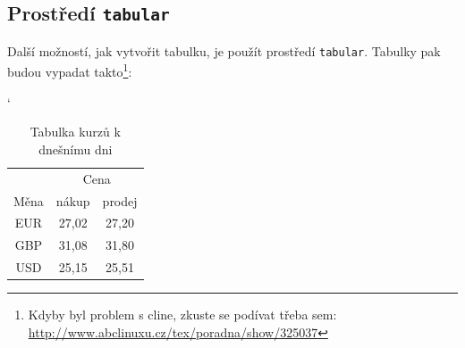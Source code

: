 \documentclass[11pt, a4paper]{article}
\begin{document}
\subsection{Prostředí \texttt{tabular}}
Další možností, jak vytvořit tabulku, je použít prostředí \verb|tabular|. Tabulky pak budou vypadat takto\footnote{Kdyby byl problem s cline, zkuste se podívat třeba sem: \url{http://www.abclinuxu.cz/tex/poradna/show/325037}}: \\
\begin{table}[h] \catcode`
	\begin{center}
		\begin{tabular}{|c|c|c|} \hline
		& \multicolumn{2}{|c|}{Cena} \\ \cline{2-3}
		Měna & nákup & prodej \\ \hline
		EUR & 27,02 & 27,20 \\ 
		GBP & 31,08 &  31,80 \\ 
		USD & 25,15 & 25,51\\ \hline
		\end{tabular}
		\caption{Tabulka kurzů k dnešnímu dni}\label{tab:tab1}
	\end{center}
\end{table}
\end{document}

